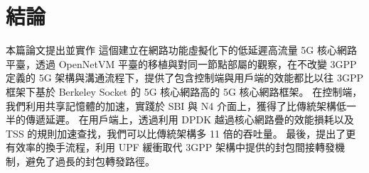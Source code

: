 \chapter{結論}
\label{chapter:conclusion}


本篇論文提出並實作 \LHCN 這個建立在網路功能虛擬化下的低延遲高流量 5G 核心網路平臺，透過 OpenNetVM 平臺的移植與對同一節點部屬的觀察，在不改變 3GPP 定義的 5G 架構與溝通流程下，提供了包含控制端與用戶端的效能都比以往 3GPP 框架下基於 Berkeley Socket 的 5G 核心網路高的 5G 核心網路框架。
在控制端，我們利用共享記憶體的加速，實踐於 SBI 與 N4 介面上，獲得了比傳統架構低一半的傳遞延遲。
在用戶端上，透過利用 DPDK 越過核心網路疊的效能損耗以及 TSS 的規則加速查找，我們可以比傳統架構多 11 倍的吞吐量。
最後，\LHCN 提出了更有效率的換手流程，利用 UPF 緩衝取代 3GPP 架構中提供的封包間接轉發機制，避免了過長的封包轉發路徑。
